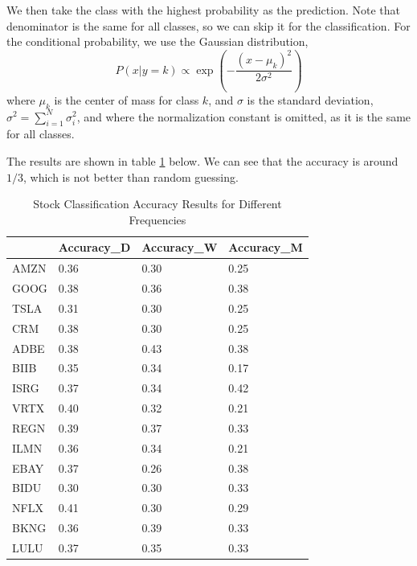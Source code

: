 \documentclass{article}
\begin{document}
We then take the class with the highest probability as the prediction.
Note that denominator is the same for all classes, so we can skip it for the
classification. For the conditional probability, we use the Gaussian distribution,
\[P\left( {x|y = k} \right) \propto \exp \left( { - \frac{{{{\left( {x - {\mu _k}} \right)}^2}}}{{2{\sigma}^2}}} \right)\]
where $\mu_k$ is the center of mass for class $k$,
and $\sigma$ is the standard deviation, $\sigma^2 = \sum\limits_{i = 1}^N {\sigma _i^2}$,
and where the normalization constant is omitted, as it is the same for all classes.

The results are  shown in table \ref{tab:results} below. We can see that the accuracy
is around $1/3$, which is not better than random guessing.

\begin{table}
    \caption{Stock Classification Accuracy Results for Different Frequencies}
    \label{tab:results}
    \begin{tabular}{llll}
        \toprule
              & Accuracy\_D & Accuracy\_W & Accuracy\_M \\
        \midrule
        AMZN  & 0.36        & 0.30        & 0.25        \\
        GOOG  & 0.38        & 0.36        & 0.38        \\
        TSLA  & 0.31        & 0.30        & 0.25        \\
        CRM   & 0.38        & 0.30        & 0.25        \\
        ADBE  & 0.38        & 0.43        & 0.38        \\
        BIIB  & 0.35        & 0.34        & 0.17        \\
        ISRG  & 0.37        & 0.34        & 0.42        \\
        VRTX  & 0.40        & 0.32        & 0.21        \\
        REGN  & 0.39        & 0.37        & 0.33        \\
        ILMN  & 0.36        & 0.34        & 0.21        \\
        EBAY  & 0.37        & 0.26        & 0.38        \\
        BIDU  & 0.30        & 0.30        & 0.33        \\
        NFLX  & 0.41        & 0.30        & 0.29        \\
        BKNG  & 0.36        & 0.39        & 0.33        \\
        LULU  & 0.37        & 0.35        & 0.33        \\

\end{tabular}
\end{table}
\end{document}
